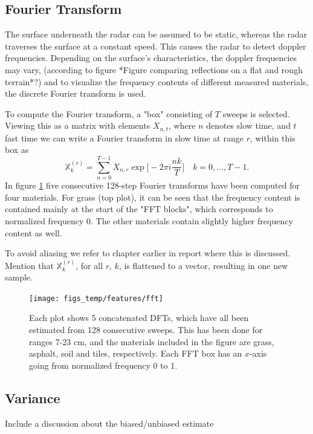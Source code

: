 \subsection{Fourier Transform}
The surface underneath the radar can be assumed to be static, whereas the radar traverses the surface at a constant speed. This causes the radar to detect doppler frequencies. Depending on the surface's characteristics, the doppler frequencies may vary, (according to figure *Figure comparing reflections on a flat and rough terrain*?) and to visualize the frequency contents of different measured materials, the discrete Fourier transform is used. 

To compute the Fourier transform, a "box" consisting of $T$ sweeps is selected. Viewing this as a matrix with elements $X_{n,t}$, where $n$ denotes slow time, and $t$ fast time we can write a Fourier transform in slow time at range $r$, within this box as
\begin{equation}
	\mathbb{X}_k^{(r)} = \sum_{n=0}^{T-1}X_{n,r}\exp\Big[-2\pi i\frac{nk}{T}\Big] \quad k=0, ..., T-1.
\end{equation}
In figure \ref{fig:fft} five consecutive 128-step Fourier transforms have been computed for four materials. For grass (top plot), it can be seen that the frequency content is contained mainly at the start of the "FFT blocks", which corresponds to normalized frequency 0. The other materials contain slightly higher frequency content as well.

To avoid aliasing we refer to chapter earlier in report where this is discussed. Mention that $\mathbb{X}_k^{(r)}$, for all $r$, $k$, is flattened to a vector, resulting in one new sample.

\begin{figure}[h]
	\centering
	\texttt{[image: figs\_temp/features/fft]}
	\caption{Each plot shows 5 concatenated DFTs, which have all been estimated from 128 consecutive sweeps. This has been done for ranges 7-23 cm, and the materials included in the figure are grass, asphalt, soil and tiles, respectively. Each FFT box has an $x$-axis going from normalized frequency 0 to 1.}
	\label{fig:fft}
\end{figure}




\subsection{Variance}

Include a discussion about the biased/unbiased estimate \\

